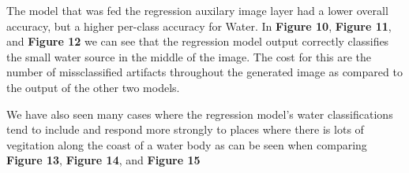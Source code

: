 \documentclass[12pt]{article}
\begin{document}
The model that was fed the regression auxilary image layer had a lower overall accuracy, but a higher per-class accuracy for Water. In \textbf{Figure 10}, \textbf{Figure 11}, and \textbf{Figure 12} we can see that the regression model output correctly classifies the small water source in the middle of the image. The cost for this are the number of missclassified artifacts throughout the generated image as compared to the output of the other two models.

\begin{figure}[H]
\end{figure}
\begin{figure}[H]
\end{figure}
\begin{figure}[H]
\end{figure}

We have also seen many cases where the regression model's water classifications tend to include and respond more strongly to places where there is lots of vegitation along the coast of a water body as can be seen when comparing \textbf{Figure 13}, \textbf{Figure 14}, and \textbf{Figure 15}
\end{document}
